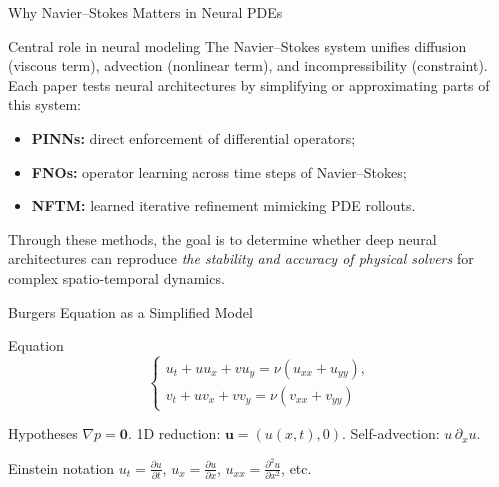 \begin{secframe}
\small
\textcolor{red_unipd}{\Large Why Navier--Stokes Matters in Neural PDEs}

\vspace{0.6em}

\begin{block}{Central role in neural modeling}
The Navier--Stokes system unifies diffusion (viscous term),  
advection (nonlinear term), and incompressibility (constraint).  
Each paper tests neural architectures by simplifying or approximating parts of this system:
\begin{itemize}
  \item \textbf{PINNs:} direct enforcement of differential operators;
  \item \textbf{FNOs:} operator learning across time steps of Navier–Stokes;
  \item \textbf{NFTM:} learned iterative refinement mimicking PDE rollouts.
\end{itemize}
\vspace{0.4em}
Through these methods, the goal is to determine whether deep neural architectures can reproduce  
\textit{the stability and accuracy of physical solvers} for complex spatio-temporal dynamics.
\end{block}
\end{secframe}






\begin{secframe}
\small
\textcolor{red_unipd}{\Large Burgers Equation as a Simplified Model}

\vspace{0.6em}

\begin{alertblock}{Equation}
\[
\begin{cases}
  u_t + u u_x + v u_y = \nu (u_{xx} + u_{yy}), \\
  v_t + u v_x + v v_y = \nu (v_{xx} + v_{yy})
\end{cases}
\]
\end{alertblock}

\vfill

\begin{block}{Hypotheses}
\(\nabla p=\mathbf{0}\). \quad
1D reduction: \(\mathbf{u}=(u(x,t),0)\). \quad
Self-advection: \(u\,\partial_x u\).
\end{block}

\vspace{0.5em}

\begin{block}{Einstein notation}
$u_t = \frac{\partial u}{\partial t}$, $u_x = \frac{\partial u}{\partial x}$, $u_{xx} = \frac{\partial^2 u}{\partial x^2}$, etc.
\end{block}

\end{secframe}

